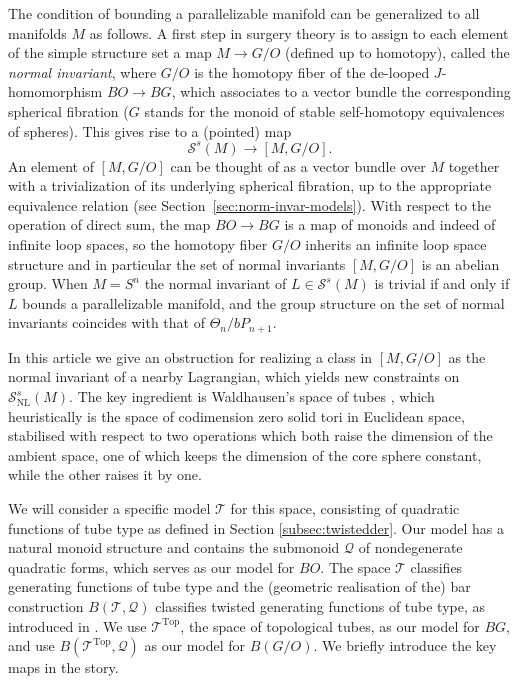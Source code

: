 \documentclass[reqno]{amsart}
\theoremstyle{theorem}
\theoremstyle{remark}
\theoremstyle{definition}
\newcommand{\T}{\mathcal{T}}
\newcommand{\QQ}{\mathcal{Q}}
\renewcommand{\SS}{\mathcal{S}}
\newcommand{\TOP}{\mathrm{Top}}
\begin{document}
The condition of bounding a parallelizable manifold can be generalized to all manifolds $M$ as follows. A first step in surgery theory is to assign to each element of the simple structure set a map $M\to G/O$ (defined up to homotopy), called
the \emph{normal invariant}, where $G/O$ is the homotopy fiber of the de-looped $J$-homomorphism $BO \to BG$, which associates to a vector bundle the corresponding spherical fibration ($G$ stands for the monoid of stable self-homotopy equivalences of spheres). This gives rise to a (pointed) map
\begin{equation}\label{eq:normal}
\SS^s(M)\to [M,G/O].
\end{equation}
An element of $[M,G/O]$ can be thought of as a vector bundle over $M$ together with a trivialization
of its underlying spherical fibration, up to the appropriate equivalence relation (see Section~\ref{sec:norm-invar-models}). With respect to the operation of direct sum, the map $BO \to BG$ is a map of monoids and indeed of infinite loop spaces, so the homotopy fiber $G/O$ inherits an infinite loop space structure and in particular the set of normal invariants $[M,G/O]$ is an abelian group. When $M=S^n$ the normal invariant of $L\in \SS^s(M)$ is trivial if and only if $L$ bounds a parallelizable manifold, and the group structure on the set of normal invariants coincides with that of $\Theta_n/bP_{n+1}$.


In this article we give an obstruction for realizing a class in $[M,G/O]$ as the normal invariant of a nearby Lagrangian, which yields new constraints on $\SS_{\text{NL}}^s(M)$. The key ingredient is Waldhausen's space of tubes \cite{W82}, which heuristically is the space of codimension zero solid tori in Euclidean space, stabilised with respect to two operations which both raise the dimension of the ambient space, one of which keeps the dimension of the core sphere constant, while the other raises it by one.  


We will consider a specific model $\T$ for this space, consisting of quadratic functions of tube type as defined in Section \ref{subsec:twistedder}. Our model has a natural monoid structure and contains the submonoid $\QQ$ of nondegenerate quadratic forms, which serves as our model for $BO$. The space $\T$ classifies generating functions of tube type and the (geometric realisation of the) bar construction $B(\T,\QQ)$ classifies twisted generating functions of tube type, as introduced in \cite{ACGK}. We use $\T^\TOP$, the space of topological tubes, as our model for $BG$, and use $B(\T^\TOP,\QQ)$ as our model for $B(G/O)$. We briefly introduce the key maps in the story.
\end{document}
